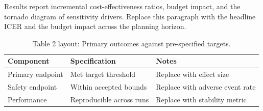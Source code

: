 
Results report incremental cost-effectiveness ratios, budget impact, and the tornado diagram of sensitivity drivers. Replace this paragraph with the headline ICER and the budget impact across the planning horizon.

\begin{table}[H]
\caption{Table 2 layout: Primary outcomes against pre-specified targets.}
\label{tab:results_primary}
\centering
\begin{tabular}{>{\raggedright\arraybackslash}p{3.4cm} >{\raggedright\arraybackslash}p{4.6cm} >{\raggedright\arraybackslash}p{5.4cm}}
\toprule
\textbf{Component} & \textbf{Specification} & \textbf{Notes} \\
\midrule
  Primary endpoint & Met target threshold & Replace with effect size \\
  Safety endpoint & Within accepted bounds & Replace with adverse event rate \\
  Performance & Reproducible across runs & Replace with stability metric \\
\bottomrule
\end{tabular}
\end{table}

